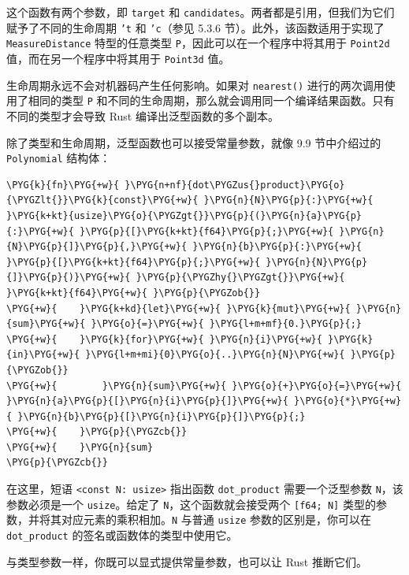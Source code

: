 这个函数有两个参数，即 \texttt{target} 和 \texttt{candidates}。两者都是引用，但我们为它们赋予了不同的生命周期 \texttt{'t} 和 \texttt{'c}（参见 5.3.6 节）。此外，该函数适用于实现了 \texttt{MeasureDistance} 特型的任意类型 \texttt{P}，因此可以在一个程序中将其用于 \texttt{Point2d} 值，而在另一个程序中将其用于 \texttt{Point3d} 值。

生命周期永远不会对机器码产生任何影响。如果对 \texttt{nearest()} 进行的两次调用使用了相同的类型 \texttt{P} 和不同的生命周期，那么就会调用同一个编译结果函数。只有不同的类型才会导致 Rust 编译出泛型函数的多个副本。

除了类型和生命周期，泛型函数也可以接受常量参数，就像 9.9 节中介绍过的 \texttt{Polynomial} 结构体：

\begin{Verbatim}[commandchars=\\\{\},breaklines=true,breakanywhere=true,fontsize=\codefont,xleftmargin=17bp]
\PYG{k}{fn}\PYG{+w}{ }\PYG{n+nf}{dot\PYGZus{}product}\PYG{o}{\PYGZlt{}}\PYG{k}{const}\PYG{+w}{ }\PYG{n}{N}\PYG{p}{:}\PYG{+w}{ }\PYG{k+kt}{usize}\PYG{o}{\PYGZgt{}}\PYG{p}{(}\PYG{n}{a}\PYG{p}{:}\PYG{+w}{ }\PYG{p}{[}\PYG{k+kt}{f64}\PYG{p}{;}\PYG{+w}{ }\PYG{n}{N}\PYG{p}{]}\PYG{p}{,}\PYG{+w}{ }\PYG{n}{b}\PYG{p}{:}\PYG{+w}{ }\PYG{p}{[}\PYG{k+kt}{f64}\PYG{p}{;}\PYG{+w}{ }\PYG{n}{N}\PYG{p}{]}\PYG{p}{)}\PYG{+w}{ }\PYG{p}{\PYGZhy{}\PYGZgt{}}\PYG{+w}{ }\PYG{k+kt}{f64}\PYG{+w}{ }\PYG{p}{\PYGZob{}}
\PYG{+w}{    }\PYG{k+kd}{let}\PYG{+w}{ }\PYG{k}{mut}\PYG{+w}{ }\PYG{n}{sum}\PYG{+w}{ }\PYG{o}{=}\PYG{+w}{ }\PYG{l+m+mf}{0.}\PYG{p}{;}
\PYG{+w}{    }\PYG{k}{for}\PYG{+w}{ }\PYG{n}{i}\PYG{+w}{ }\PYG{k}{in}\PYG{+w}{ }\PYG{l+m+mi}{0}\PYG{o}{..}\PYG{n}{N}\PYG{+w}{ }\PYG{p}{\PYGZob{}}
\PYG{+w}{        }\PYG{n}{sum}\PYG{+w}{ }\PYG{o}{+}\PYG{o}{=}\PYG{+w}{ }\PYG{n}{a}\PYG{p}{[}\PYG{n}{i}\PYG{p}{]}\PYG{+w}{ }\PYG{o}{*}\PYG{+w}{ }\PYG{n}{b}\PYG{p}{[}\PYG{n}{i}\PYG{p}{]}\PYG{p}{;}
\PYG{+w}{    }\PYG{p}{\PYGZcb{}}
\PYG{+w}{    }\PYG{n}{sum}
\PYG{p}{\PYGZcb{}}
\end{Verbatim}

在这里，短语 \texttt{<const N: usize>} 指出函数 \texttt{dot\_product} 需要一个泛型参数 \texttt{N}，该参数必须是一个 \texttt{usize}。给定了 \texttt{N}，这个函数就会接受两个 \texttt{[f64; N]} 类型的参数，并将其对应元素的乘积相加。\texttt{N} 与普通 \texttt{usize} 参数的区别是，你可以在 \texttt{dot\_product} 的签名或函数体的类型中使用它。

与类型参数一样，你既可以显式提供常量参数，也可以让 Rust 推断它们。


